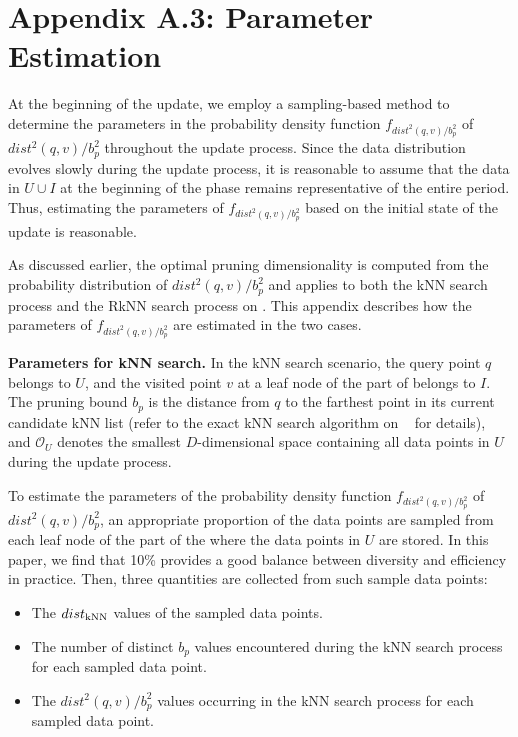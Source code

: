 \section*{Appendix A.3: Parameter Estimation}
 At the beginning of the update, we employ a sampling-based method to determine the parameters in the probability density function $f_{dist^2(q,v)/b_{p}^2}$ of $dist^2(q,v)/b_{p}^2$ throughout the update process. Since the data distribution evolves slowly during the update process, it is reasonable to assume that the data in $U\cup I$ at the beginning of the phase remains representative of the entire period. Thus, estimating the parameters of $f_{dist^2(q,v)/b^2_{p}}$ based on the initial state of the update is reasonable.

As discussed earlier, the optimal pruning dimensionality is computed from the probability distribution of $dist^2(q,v)/b_{p}^2$ and applies to both the kNN search process and the RkNN search process on \dualtree. This appendix describes how the parameters of $f_{dist^2(q,v)/b_{p}^2}$ are estimated in the two cases.

\noindent\textbf{Parameters for kNN search.}
In the kNN search scenario, the query point $q$ belongs to $U$, and the visited point $v$ at a leaf node of the \deltatree part of \dualtree belongs to $I$. The pruning bound $b_p$ is the distance from $q$ to the farthest point in its current candidate kNN list (refer to the exact kNN search algorithm on \deltatree~\cite{cui2003contorting} for details), and $\mathcal{O}_U$ denotes the smallest $D$-dimensional space containing all data points in $U$ during the update process. 

To estimate the parameters of the probability density function $f_{dist^2(q,v)/b^2_p}$ of $dist^2(q,v)/b^2_p$, an appropriate proportion of the data points are sampled from each leaf node of the \hdrtree part of the \dualtree where the data points in $U$ are stored. In this paper, we find that 10\% provides a good balance between diversity and efficiency in practice. Then, three quantities are collected from such sample data points:
\begin{itemize}
    \item The $dist_{\operatorname{kNN}}$ values of the sampled data points.
    \item The number of distinct $b_p$ values encountered during the kNN search process for each sampled data point.
    \item The $dist^2(q,v)/b_{p}^2$ values occurring in the kNN search process for each sampled data point.  
\end{itemize}

